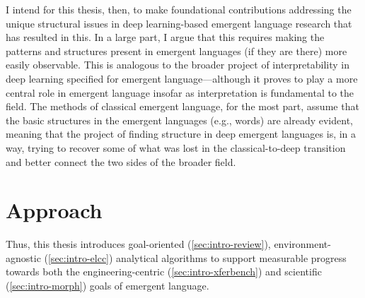 I intend for this thesis, then, to make foundational contributions addressing the unique structural issues in deep learning-based emergent language research that has resulted in this.
In a large part, I argue that this requires making the patterns and structures present in emergent languages (if they are there) more easily observable.
This is analogous to the broader project of interpretability in deep learning specified for emergent language---although it proves to play a more central role in emergent language insofar as interpretation is fundamental to the field.
The methods of classical emergent language, for the most part, assume that the basic structures in the emergent languages (e.g., words) are already evident,
  meaning that the project of finding structure in deep emergent languages is, in a way, trying to recover some of what was lost in the classical-to-deep transition and better connect the two sides of the broader field.



\section{Approach}

Thus, this thesis introduces goal-oriented (\cref{sec:intro-review}), environment-agnostic (\cref{sec:intro-elcc}) analytical algorithms to support measurable progress towards both the engineering-centric (\cref{sec:intro-xferbench}) and scientific (\cref{sec:intro-morph}) goals of emergent language.

